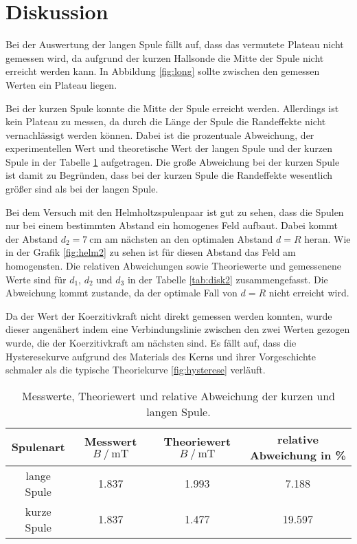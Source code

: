 \section{Diskussion}
\label{sec:Diskussion}

Bei der Auswertung der langen Spule fällt auf, dass das vermutete Plateau nicht gemessen wird, da aufgrund der kurzen Hallsonde die Mitte der Spule nicht erreicht werden kann.
In Abbildung \ref{fig:long} sollte zwischen den gemessen Werten ein Plateau liegen.

Bei der kurzen Spule konnte die Mitte der Spule erreicht werden. 
Allerdings ist kein Plateau zu messen, da durch die Länge der Spule die Randeffekte nicht vernachlässigt werden können.
Dabei ist die prozentuale Abweichung, der experimentellen Wert und theoretische Wert der langen Spule und der kurzen Spule in der Tabelle \ref{tab:disk1} aufgetragen.
Die große Abweichung bei der kurzen Spule ist damit zu Begründen, dass bei der kurzen Spule die Randeffekte wesentlich größer sind als bei der langen Spule.

Bei dem Versuch mit den Helmholtzspulenpaar ist gut zu sehen, dass die Spulen nur bei einem bestimmten Abstand ein homogenes Feld aufbaut.
Dabei kommt der Abstand $d_2=\SI{7}{\centi\meter}$ am nächsten an den optimalen Abstand $d=R$ heran. Wie in der Grafik \ref{fig:helm2} zu sehen ist für diesen Abstand das Feld am homogensten.
Die relativen Abweichungen sowie Theoriewerte und gemessenene Werte sind für $d_1$, $d_2$ und $d_3$ in der Tabelle \ref{tab:disk2} zusammengefasst.
Die Abweichung kommt zustande, da der optimale Fall von $d=R$ nicht erreicht wird.

Da der Wert der Koerzitivkraft nicht direkt gemessen werden konnten, wurde dieser angenähert indem eine Verbindungslinie zwischen den zwei Werten gezogen wurde, die der Koerzitivkraft am nächsten sind.
Es fällt auf, dass die Hysteresekurve aufgrund des Materials des Kerns und ihrer Vorgeschichte schmaler als die typische Theoriekurve \ref{fig:hysterese} verläuft.

\begin{table}
\centering
\caption{Messwerte, Theoriewert und relative Abweichung der kurzen und langen Spule.}
\begin{tabular}{c|ccc}
    \toprule
    Spulenart &  Messwert $B\:/\: \si{\milli\tesla}$ & Theoriewert $B\:/\: \si{\milli\tesla}$ & relative Abweichung in \% \\
    \midrule
    lange Spule & 1.837 & 1.993 & 7.188\\
    kurze Spule & 1.837 & 1.477 & 19.597 \\
    \bottomrule
\end{tabular}
\label{tab:disk1}
\end{table}


